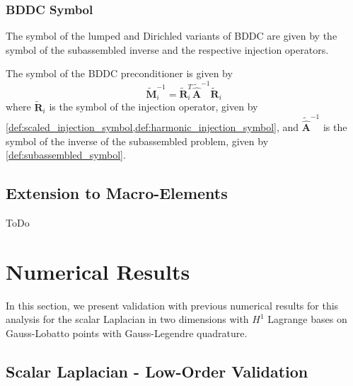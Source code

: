 \documentclass[review]{siamart190516}
\begin{document}
\subsubsection{BDDC Symbol}\label{sec:lfabddcsymbol}

The symbol of the lumped and Dirichled variants of BDDC are given by the symbol of the subassembled inverse and the respective injection operators.

\begin{definition}\label{def:lumped_bddc_symbol}
The symbol of the BDDC preconditioner is given by
\begin{equation}
\tilde{\mathbf{M}}^{-1}_i = \tilde{\mathbf{R}}^T_i \tilde{\hat{\mathbf{A}}}^{-1} \tilde{\mathbf{R}}_i
\end{equation}
where $\tilde{\mathbf{R}}_i$ is the symbol of the injection operator, given by \cref{def:scaled_injection_symbol,def:harmonic_injection_symbol}, and $\tilde{\hat{\mathbf{A}}}^{-1}$ is the symbol of the inverse of the subassembled problem, given by \cref{def:subassembled_symbol}.
\end{definition}

\subsection{Extension to Macro-Elements}\label{sec:previouswork}

ToDo

\section{Numerical Results}\label{sec:results}

In this section, we present validation with previous numerical results for this analysis for the scalar Laplacian in two dimensions with $H^1$ Lagrange bases on Gauss-Lobatto points with Gauss-Legendre quadrature.

\subsection{Scalar Laplacian - Low-Order Validation}\label{sec:lowordervalidate}
\end{document}
